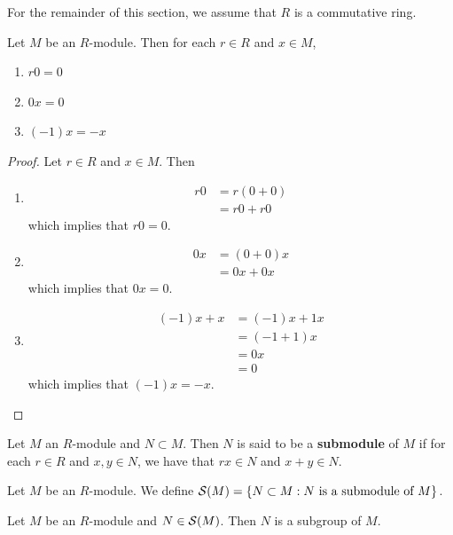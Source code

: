 \documentclass{book}
\begin{document}
	\begin{note}
		For the remainder of this section, we assume that $R$ is a commutative ring. 
	\end{note}
	
	\begin{ex}
		Let $M$ be an $R$-module. Then for each $r \in R$ and $x \in M$, 
		\begin{enumerate}
			\item $r0 = 0$
			\item $0x = 0$
			\item $(-1)x = -x$
		\end{enumerate}
	\end{ex}
	
	\begin{proof} Let $r \in R$ and $x \in M$. Then 
		\begin{enumerate}
			\item 
			\begin{align*}
				r0 
				&= r(0+0) \\
				&= r0 + r0
			\end{align*} 
			which implies that $r0 = 0$.
			\item 
			\begin{align*}
				0x 
				&= (0+0)x \\
				&= 0x + 0x
			\end{align*} 
			which implies that $0x = 0$.
			\item 
			\begin{align*}
				(-1)x + x 
				&= (-1)x + 1x \\ 
				&= (-1 + 1)x \\
				&= 0x \\
				&= 0
			\end{align*}
			which implies that $(-1)x = -x$.
		\end{enumerate}
	\end{proof}
	
	\begin{defn}
		Let $M$ an $R$-module and $N \subset M$. Then $N$ is said to be a \textbf{submodule} of $M$ if for each $r \in R$ and $x,y \in N$, we have that $rx \in N$ and $x+y \in N$.
	\end{defn}
	
	\begin{defn}
		Let $M$ be an $R$-module. We define $\mathcal{S}(M) = \{N \subset M: N \text{ is a submodule of }M\}$.
	\end{defn}	
	
	\begin{ex}
		Let $M$ be an $R$-module and $N \in \mathcal{S}(M)$. Then $N$ is a subgroup of $M$.
	\end{ex}
	
\end{document}
